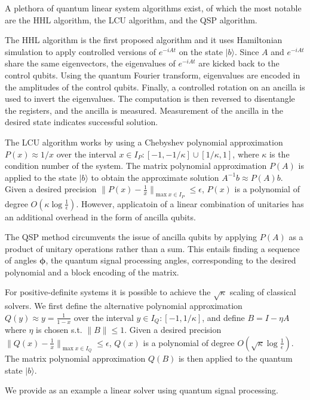 \documentclass{article}
\begin{document}
A plethora of quantum linear system algorithms exist, of which the most notable are the HHL algorithm, the LCU algorithm, and the QSP algorithm.

The HHL algorithm is the first proposed algorithm and it uses Hamiltonian simulation to apply controlled versions of $e^{-iAt}$ on the state $\lvert b \rangle$. Since $A$ and $e^{-iAt}$ share the same eigenvectors, the eigenvalues of $e^{-iAt}$ are kicked back to the control qubits. Using the quantum Fourier transform, eigenvalues are encoded in the amplitudes of the control qubits. Finally, a controlled rotation on an ancilla is used to invert the eigenvalues. The computation is then reversed to disentangle the registers, and the ancilla is measured. Measurement of the ancilla in the desired state indicates successful solution.

The LCU algorithm works by using a  Chebyshev polynomial approximation $P(x) \approx 1/x$ over the interval $x \in I_P : [-1,-1/\kappa]\cup[1/\kappa,1]$, where $\kappa$ is the condition number of the system. The matrix polynomial approximation $P(A)$ is applied to the state $\lvert b \rangle$ to obtain the approximate solution $A^{-1}b \approx P(A) b$. Given a desired precision $\lVert P(x) - \frac{1}{x} \rVert _{\max x \in I_P} \leq \epsilon$, $P(x)$ is a polynomial of degree $O(\kappa \log{\frac{1}{\epsilon}})$. However, applicatoin of a linear combination of unitaries has an additional overhead in the form of ancilla qubits. 

The QSP method circumvents the issue of ancilla qubits by applying $P(A)$ as a product of unitary operations rather than a sum. This entails finding a sequence of angles $\mathbf{\phi}$, the quantum signal processing angles, corresponding to the desired polynomial and a block encoding of the matrix.

For positive-definite systems it is possible to achieve the $\sqrt{\kappa}$ scaling of classical solvers. We first define the alternative polynomial approximation $Q(y) \approx y = \frac{1}{1-x}$ over the interval $y \in I_Q : [-1,1/\kappa]$, and define $B = I - \eta A$ where $\eta$ is chosen s.t. $\lVert B \rVert \leq 1$. Given a desired precision $\lVert Q(x) - \frac{1}{x} \rVert _{\max x \in I_Q} \leq \epsilon$, $Q(x)$ is a polynomial of degree $O(\sqrt{\kappa} \log{\frac{1}{\epsilon}})$. The matrix polynomial approximation $Q(B)$ is then applied to the quantum state $\lvert b \rangle$.

We provide as an example a linear solver using quantum signal processing.
\end{document}
